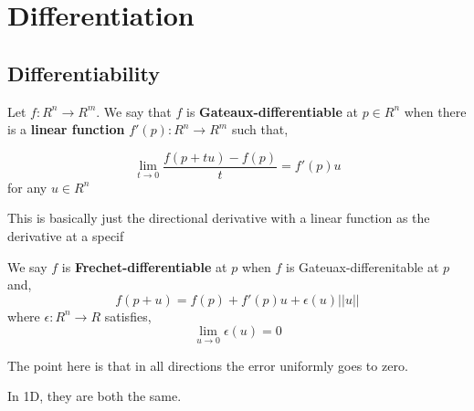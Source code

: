 \chapter{Differentiation}
    
\section{Differentiability}
\begin{definition}
    Let $f: R^{n} \to R^{m}$. We say that $f$ is \textbf{Gateaux-differentiable} at $p \in R^{n}$ when there is  a \textbf{linear function} $f'(p): R^{n} \to R^{m}$ such that, 
    
    \[
        \lim_{t \to 0} \frac{f(p + tu) - f(p)}{t} = f'(p) u
    \]
    for any $u \in R^{n}$
\end{definition}
\begin{remark}
    This is basically just the directional derivative with a linear function as the derivative at a specif
\end{remark}

\begin{definition}
    We say $f$ is \textbf{Frechet-differentiable} at $p$ when $f$ is Gateuax-differenitable at $p$ and, 
    \[
        f(p + u) = f(p) + f'(p) u + \epsilon(u)\left | \left | u\right |\right |
    \]
    where $\epsilon: R^{n} \to R$ satisfies, 
    \[
        \lim_{u \to 0} \epsilon(u) = 0
    \]
\end{definition}
\begin{remark}
    The point here is that in all directions the error uniformly goes to zero.
\end{remark}
\begin{remark}
    In 1D, they are both the same.
\end{remark}

